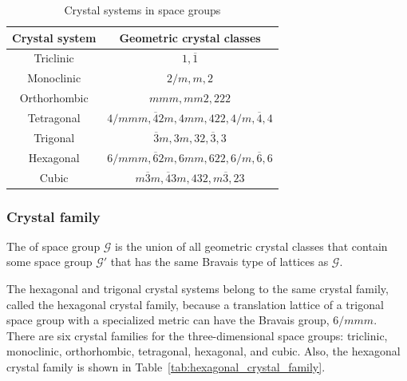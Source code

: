 \begin{table}[htb]
  \centering
  \caption{Crystal systems in space groups}
  \label{tab:crystal_system}
  \begin{tabular}{cc}
    \hline\hline
    Crystal system & Geometric crystal classes                                \\ \hline
    Triclinic      & $1, \overline{1}$                                        \\
    Monoclinic     & $2/m, m, 2$                                              \\
    Orthorhombic   & $mmm, mm2, 222$                                          \\
    Tetragonal     & $4/mmm, \overline{4}2m, 4mm, 422, 4/m, \overline{4}, 4$  \\
    Trigonal       & $\overline{3}m, 3m, 32, \overline{3}, 3$                 \\
    Hexagonal      & $6/mmm, \overline{6}2m, 6mm, 622, 6/m, \overline{6}, 6$  \\
    Cubic          & $m\overline{3}m, \overline{4}3m, 432, m\overline{3}, 23$ \\
    \hline\hline
  \end{tabular}
\end{table}

\subsubsection{\label{sec:crystal-family}Crystal family}


\begin{screen}
  \begin{defn}
    The  of space group $\mathcal{G}$ is the union of all geometric crystal classes that contain some space group $\mathcal{G}'$ that has the same Bravais type of lattices as $\mathcal{G}$.
  \end{defn}
\end{screen}

The hexagonal and trigonal crystal systems belong to the same crystal family, called the hexagonal crystal family, because a translation lattice of a trigonal space group with a specialized metric can have the Bravais group, $6/mmm$.
There are six crystal families for the three-dimensional space groups: triclinic, monoclinic, orthorhombic, tetragonal, hexagonal, and cubic.
Also, the hexagonal crystal family is shown in Table~\ref{tab:hexagonal_crystal_family}.

